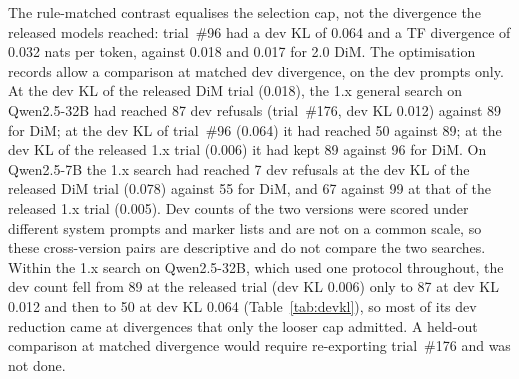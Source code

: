 The rule-matched contrast equalises the selection cap, not the divergence the released models reached: trial~\#96
had a dev KL of 0.064 and a TF divergence of 0.032 nats per token, against 0.018 and 0.017 for 2.0 DiM. The
optimisation records allow a comparison at matched dev divergence, on the dev prompts only. At the dev KL of the
released DiM trial (0.018), the 1.x general search on Qwen2.5-32B had reached 87 dev refusals (trial~\#176, dev KL
0.012) against 89 for DiM; at the dev KL of trial~\#96 (0.064) it had reached 50 against 89; at the dev KL of the
released 1.x trial (0.006) it had kept 89 against 96 for DiM. On Qwen2.5-7B the 1.x search had reached 7 dev refusals
at the dev KL of the released DiM trial (0.078) against 55 for DiM, and 67 against 99 at that of the released 1.x
trial (0.005). Dev counts of the two versions were scored under different system prompts and marker lists and are
not on a common scale, so these cross-version pairs are descriptive and do not compare the two searches. Within the
1.x search on Qwen2.5-32B, which used one protocol throughout, the dev count fell from 89 at the released trial (dev
KL 0.006) only to 87 at dev KL 0.012 and then to 50 at dev KL 0.064 (Table~\ref{tab:devkl}), so most of its dev
reduction came at divergences that only the looser cap admitted. A held-out comparison at matched divergence would require re-exporting trial~\#176 and was
not done.


